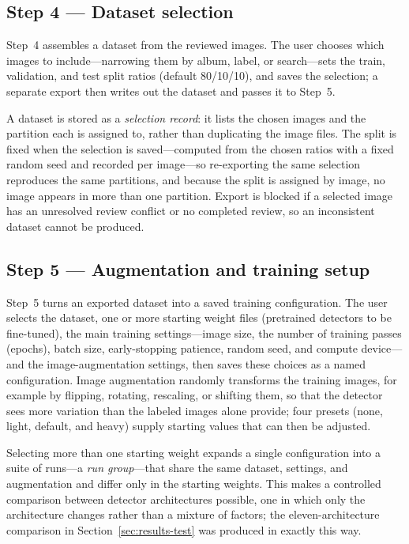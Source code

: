 \documentclass[10pt, letterpaper, twocolumn]{article}
\begin{document}
\subsection{Step 4 --- Dataset selection}

Step~4 assembles a dataset from the reviewed images. The user chooses which images to include---narrowing them by album, label, or search---sets the train, validation, and test split ratios (default 80/10/10), and saves the selection; a separate export then writes out the dataset and passes it to Step~5.

A dataset is stored as a \emph{selection record}: it lists the chosen images and the partition each is assigned to, rather than duplicating the image files. The split is fixed when the selection is saved---computed from the chosen ratios with a fixed random seed and recorded per image---so re-exporting the same selection reproduces the same partitions, and because the split is assigned by image, no image appears in more than one partition. Export is blocked if a selected image has an unresolved review conflict or no completed review, so an inconsistent dataset cannot be produced.

\subsection{Step 5 --- Augmentation and training setup}

Step~5 turns an exported dataset into a saved training configuration. The user selects the dataset, one or more starting weight files (pretrained detectors to be fine-tuned), the main training settings---image size, the number of training passes (epochs), batch size, early-stopping patience, random seed, and compute device---and the image-augmentation settings, then saves these choices as a named configuration. Image augmentation randomly transforms the training images, for example by flipping, rotating, rescaling, or shifting them, so that the detector sees more variation than the labeled images alone provide; four presets (none, light, default, and heavy) supply starting values that can then be adjusted.

Selecting more than one starting weight expands a single configuration into a suite of runs---a \emph{run group}---that share the same dataset, settings, and augmentation and differ only in the starting weights. This makes a controlled comparison between detector architectures possible, one in which only the architecture changes rather than a mixture of factors; the eleven-architecture comparison in Section~\ref{sec:results-test} was produced in exactly this way.
\end{document}
